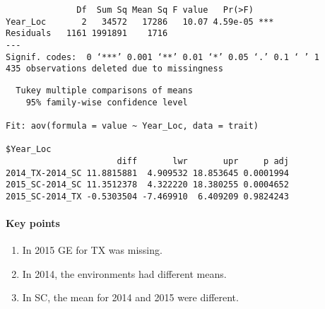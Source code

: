 \documentclass[11pt]{article}
\providecommand{\tightlist}{%
      \setlength{\itemsep}{0pt}\setlength{\parskip}{0pt}}
\begin{document}
    
    
    \begin{verbatim}
              Df  Sum Sq Mean Sq F value   Pr(>F)    
Year_Loc       2   34572   17286   10.07 4.59e-05 ***
Residuals   1161 1991891    1716                     
---
Signif. codes:  0 ‘***’ 0.001 ‘**’ 0.01 ‘*’ 0.05 ‘.’ 0.1 ‘ ’ 1
435 observations deleted due to missingness
    \end{verbatim}

    
    
    \begin{verbatim}
  Tukey multiple comparisons of means
    95% family-wise confidence level

Fit: aov(formula = value ~ Year_Loc, data = trait)

$Year_Loc
                      diff       lwr       upr     p adj
2014_TX-2014_SC 11.8815881  4.909532 18.853645 0.0001994
2015_SC-2014_SC 11.3512378  4.322220 18.380255 0.0004652
2015_SC-2014_TX -0.5303504 -7.469910  6.409209 0.9824243

    \end{verbatim}

    
    \paragraph{Key points}\label{key-points}

\begin{enumerate}
\def\labelenumi{\arabic{enumi}.}
\tightlist
\item
  In 2015 GE for TX was missing.
\item
  In 2014, the environments had different means.
\item
  In SC, the mean for 2014 and 2015 were different.
\end{enumerate}


    
    
    
    
\end{document}

